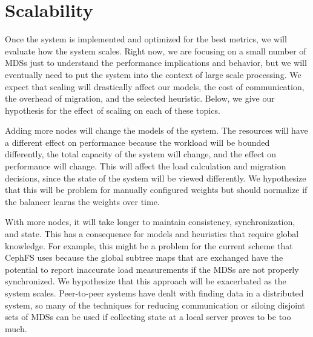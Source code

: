 \chapter{Scalability}
\label{scalability}
Once the system is implemented and optimized for the best metrics, we will evaluate how the system scales. Right now, we are focusing on a small number of MDSs just to understand the performance implications and behavior, but we will eventually need to put the system into the context of large scale processing. We expect that scaling will drastically affect our models, the cost of communication, the overhead of migration, and the selected heuristic. Below, we give our hypothesis for the effect of scaling on each of these topics.

Adding more nodes will change the models of the system. The resources will have a different effect on performance because the workload will be bounded differently, the total capacity of the system will change, and the effect on performance will change. This will affect the load calculation and migration decisions, since the state of the system will be viewed differently. We hypothesize that this will be problem for manually configured weights but should normalize if the balancer learns the weights over time. 

With more nodes, it will take longer to maintain consistency, synchronization, and state. This has a consequence for models and heuristics that require global knowledge. For example, this might be a problem for the current scheme that CephFS uses because the global subtree maps that are exchanged have the potential to report inaccurate load measurements if the MDSs are not properly synchronized. We hypothesize that this approach will be exacerbated as the system scales. Peer-to-peer systems have dealt with finding data in a distributed system, so many of the techniques for reducing communication or siloing disjoint sets of MDSs can be used if collecting state at a local server proves to be too much. 


